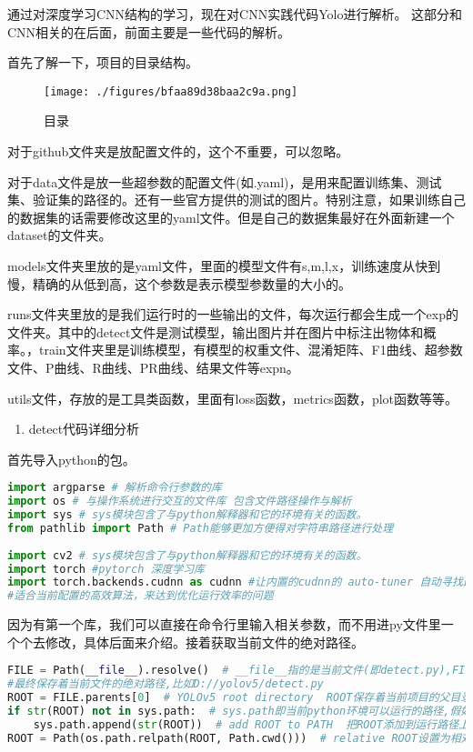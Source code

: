 

通过对深度学习CNN结构的学习，现在对CNN实践代码Yolo进行解析。
这部分和CNN相关的在后面，前面主要是一些代码的解析。

首先了解一下，项目的目录结构。\begin{figure}[ht]
\centering
\texttt{[image: ./figures/bfaa89d38baa2c9a.png]}
\caption{目录} \label{fig_yolov5_1}
\end{figure}
对于github文件夹是放配置文件的，这个不重要，可以忽略。

对于data文件是放一些超参数的配置文件(如.yaml)，是用来配置训练集、测试集、验证集的路径的。还有一些官方提供的测试的图片。特别注意，如果训练自己的数据集的话需要修改这里的yaml文件。但是自己的数据集最好在外面新建一个dataset的文件夹。

models文件夹里放的是yaml文件，里面的模型文件有s,m,l,x，训练速度从快到慢，精确的从低到高，这个参数是表示模型参数量的大小的。

runs文件夹里放的是我们运行时的一些输出的文件，每次运行都会生成一个exp的文件夹。其中的detect文件是测试模型，输出图片并在图片中标注出物体和概率。，train文件夹里是训练模型，有模型的权重文件、混淆矩阵、F1曲线、超参数文件、P曲线、R曲线、PR曲线、结果文件等expn。

utils文件，存放的是工具类函数，里面有loss函数，metrics函数，plot函数等等。

\begin{enumerate}
\item detect代码详细分析
\end{enumerate}
首先导入python的包。
\begin{lstlisting}[language=python]
import argparse # 解析命令行参数的库
import os # 与操作系统进行交互的文件库 包含文件路径操作与解析
import sys # sys模块包含了与python解释器和它的环境有关的函数。
from pathlib import Path # Path能够更加方便得对字符串路径进行处理
 
import cv2 # sys模块包含了与python解释器和它的环境有关的函数。
import torch #pytorch 深度学习库
import torch.backends.cudnn as cudnn #让内置的cudnn的 auto-tuner 自动寻找最
#适合当前配置的高效算法，来达到优化运行效率的问题
\end{lstlisting}
因为有第一个库，我们可以直接在命令行里输入相关参数，而不用进py文件里一个个去修改，具体后面来介绍。接着获取当前文件的绝对路径。
\begin{lstlisting}[language=python]
FILE = Path(__file__).resolve()  # __file__指的是当前文件(即detect.py),FILE
#最终保存着当前文件的绝对路径,比如D://yolov5/detect.py
ROOT = FILE.parents[0]  # YOLOv5 root directory  ROOT保存着当前项目的父目录,#比如 D://yolov5
if str(ROOT) not in sys.path:  # sys.path即当前python环境可以运行的路径,假如当#前项目不在该路径中,就无法运行其中的模块,所以就需要加载路径
    sys.path.append(str(ROOT))  # add ROOT to PATH  把ROOT添加到运行路径上
ROOT = Path(os.path.relpath(ROOT, Path.cwd()))  # relative ROOT设置为相对路径
\end{lstlisting}